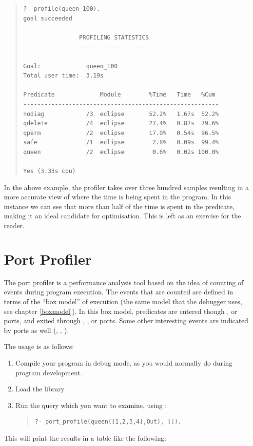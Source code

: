 \vfill %

\begin{quote}
\begin{verbatim}
?- profile(queen_100).
goal succeeded

                PROFILING STATISTICS
                --------------------

Goal:             queen_100
Total user time:  3.19s

Predicate             Module        %Time   Time   %Cum
--------------------------------------------------------
nodiag            /3  eclipse       52.2%   1.67s  52.2%
qdelete           /4  eclipse       27.4%   0.87s  79.6%
qperm             /2  eclipse       17.0%   0.54s  96.5%
safe              /1  eclipse        2.8%   0.09s  99.4%
queen             /2  eclipse        0.6%   0.02s 100.0%

Yes (3.33s cpu)
\end{verbatim}
\end{quote}

In the above example, the profiler takes over three hundred samples
resulting in a more accurate view of where the time is being spent in
the program.  In this instance we can see that more than half of the
time is spent in the  predicate, making it an ideal
candidate for optimisation.  This is left as an exercise for the
reader.


\section{Port Profiler}
The port profiler is a performance analysis tool based on the idea of
counting of events during program execution.  The events that are
counted are defined in terms of the ``box model'' of execution (the same
model that the debugger uses, see chapter \ref{boxmodel}).  In this
box model, predicates are entered though ,  or
 ports,
and exited through , ,  or 
ports.  Some other interesting events are indicated by ports as well
(, , ).

The usage is as follows:
\begin{enumerate}
\item Compile your program in debug mode, as you would normally do during
program development.
\item Load the  library
\item Run the query which you want to examine, using
:
\begin{quote}
\begin{verbatim}
?- port_profile(queen([1,2,3,4],Out), []).
\end{verbatim}
\end{quote}
\end{enumerate}
This will print the results in a table like the following:

